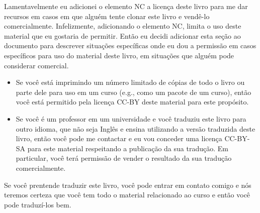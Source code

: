 Lamentavelmente eu adicionei o elemento NC a licença deste livro para me dar 
recursos em casos em que alguém tente clonar este livro e vendê-lo 
comercialmente. Infelizmente, adicionando o elemento NC, limita o uso deste
material que eu gostaria de permitir. Então eu decidi adicionar esta seção
ao documento para descrever situações específicas onde eu dou a permissão em 
casos específicos para uso do material deste livro, em situações que alguém 
pode considerar comercial.

\begin{itemize}

\item Se você está imprimindo um número limitado de cópias de todo o livro ou 
parte dele para uso em um curso (e.g., como um pacote de um curso), então
você está permitido pela licença CC-BY deste material para este propósito.


\item Se você é um professor em um universidade e você traduziu este livro
para outro idioma, que não seja Inglês e ensina utilizando a versão 
traduzida deste livro, então você pode me contactar e eu vou conceder 
uma licença CC-BY-SA para este material respeitando a publicação da sua
tradução. Em particular, você terá permissão de vender o resultado da sua 
tradução comercialmente.
\end{itemize}


Se você prentende traduzir este livro, você pode entrar em contato comigo
e nós teremos certeza que você tem todo o material relacionado ao curso e
então você pode traduzí-los bem.

